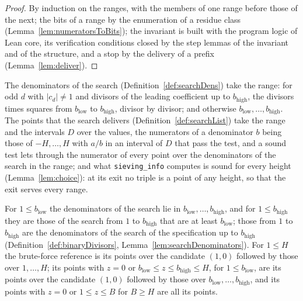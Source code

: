 \begin{proof}
  \leanok
  By induction on the ranges, with the members of one range before those of the next; the bits of a
  range by the enumeration of a residue class (Lemma~\ref{lem:numeratorsToBits}); the invariant is
  built with the program logic of Lean core, its verification conditions closed by the step lemmas
  of the invariant and of the structure, and a stop by the delivery of a prefix
  (Lemma~\ref{lem:deliver}).
\end{proof}

The denominators of the search (Definition~\ref{def:searchDens}) take the range: for odd $d$ with
$|c_d| \ne 1$ and divisors of the leading coefficient up to $b_{\mathrm{high}}$, the divisors times
squares from $b_{\mathrm{low}}$ to $b_{\mathrm{high}}$, divisor by divisor; and otherwise
$b_{\mathrm{low}}, \dots, b_{\mathrm{high}}$. The points that the search delivers
(Definition~\ref{def:searchList}) take the range and the intervals $D$ over the values, the
numerators of a denominator $b$ being those of $-H, \dots, H$ with $a/b$ in an interval of $D$ that
pass the test, and a sound test lets through the numerator of every point over the denominators of
the search in the range; and what \verb|sieving_info| computes is sound for every height
(Lemma~\ref{lem:choice}): at its exit no triple is a point of any height, so that the exit
serves every range.

\begin{lemma}\label{lem:searchDensRange}
  \leanok
  For $1 \le b_{\mathrm{low}}$ the denominators of the search lie in
  $b_{\mathrm{low}}, \dots, b_{\mathrm{high}}$, and for $1 \le b_{\mathrm{high}}$ they are those of
  the search from $1$ to $b_{\mathrm{high}}$ that are at least $b_{\mathrm{low}}$; those from $1$ to
  $b_{\mathrm{high}}$ are the denominators of the search of the specification up to
  $b_{\mathrm{high}}$ (Definition~\ref{def:binaryDivisors}, Lemma~\ref{lem:searchDenominators}).
  For $1 \le H$ the brute-force reference is its points over the candidate $(1, 0)$ followed by
  those over $1, \dots, H$; its points with $z = 0$ or
  $b_{\mathrm{low}} \le z \le b_{\mathrm{high}} \le H$, for $1 \le b_{\mathrm{low}}$, are its points
  over the candidate $(1, 0)$ followed by those over $b_{\mathrm{low}}, \dots, b_{\mathrm{high}}$,
  and its points with $z = 0$ or $1 \le z \le B$ for $B \ge H$ are all its points.
\end{lemma}

